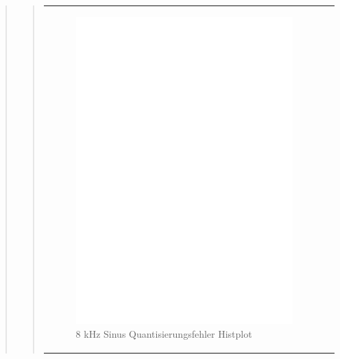 \begin{quote}
\begin{quote}
\begin{center}
\begin{tabular}{ll}
                \begin{minipage}{0.6\textwidth}
                    \begin{figure}[H]
                        \includegraphics[scale=0.5, trim = 16mm 70mm 16mm 85mm, clip]
                                        {Bilder/8kHz_sin_Quant_Hist}
                        \caption{8 kHz Sinus Quantisierungsfehler Histplot}
                        \label{fig:8kHz_sin_Hist}
                    \end{figure}
                \end{minipage}
            
            \end{tabular}
        \end{center}
        
        \vspace{2em}
        

\end{quote}
\end{quote}
